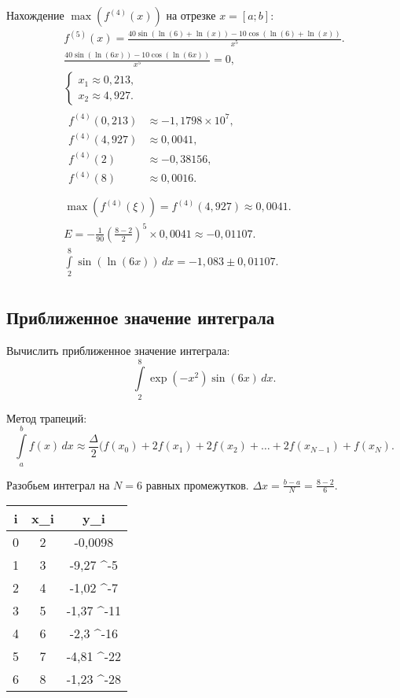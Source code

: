 \documentclass[10pt, a4paper, titlepage]{article}
\begin{document}
Нахождение $\max(f^{(4)}(x))$ на отрезке $x=[a; b]$:
\begin{gather*}
    f^{(5)}(x) = \frac{40\sin(\ln(6)+\ln(x))-10\cos(\ln(6)+\ln(x))}{x^5} .\\
    \frac{40\sin(\ln(6x))-10\cos(\ln(6x))}{x^5} = 0 ,\\
    \begin{cases}
        x_1\approx0,213 ,\\
        x_2\approx4,927 .
    \end{cases}
    \\
    \begin{aligned}
        f^{(4)}(0,213) &\approx -1,1798\times10^7 ,\\
        f^{(4)}(4,927) &\approx 0,0041 ,\\
        f^{(4)}(2) &\approx -0,38156 ,\\
        f^{(4)}(8) &\approx 0,0016 .\\
    \end{aligned}
    \\
    \max(f^{(4)}(\xi)) = f^{(4)}(4,927) \approx 0,0041 .\\
    E = -\frac{1}{90}\left(\frac{8-2}{2}\right)^5\times0,0041 \approx -0,01107 .\\
    \int\limits_2^{8} \sin(\ln(6x))\,dx = -1,083\pm0,01107 .\\
\end{gather*}


\subsection*{Приближенное значение интеграла}

Вычислить приближенное значение интеграла:
$$\int\limits_2^8 \exp(-x^2)\sin(6x)\,dx .$$

Метод трапеций:
$$\int\limits_a^b f(x) \, dx \approx \frac{\Delta}{2} (f(x_0)+2f(x_1)+2f(x_2)+\dots+2f(x_{N-1})+f(x_N) .$$

Разобьем интеграл на $N=6$ равных промежутков. $\Delta x=\frac{b-a}{N}=\frac{8-2}{6}$.

\begin{center}
    \begin{tabular}{|*{3}{C|}}
        \hline
        i & x_i & y_i \\  & 2 & -0,0098 \\  & 3 & -9,27 ^{-5}  \\  & 4 & -1,02 ^{-7}  \\  & 5 & -1,37 ^{-11}  \\  & 6 & -2,3 ^{-16}  \\  & 7 & -4,81 ^{-22}  \\  & 8 & -1,23 ^{-28}  \\ \hline
    \end{tabular}
\end{center}
\end{document}
